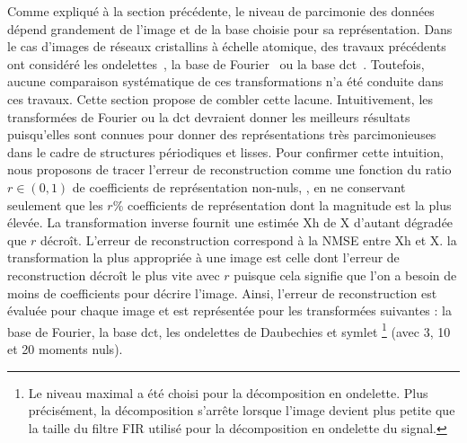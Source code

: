 Comme expliqué à la section précédente, le niveau de parcimonie des données dépend grandement de l'image et de la base choisie pour sa représentation. Dans le cas d'images de réseaux cristallins à échelle atomique, des travaux précédents ont considéré les ondelettes~\cite{li2018compressive}, la base de Fourier~\cite{stevens2018apl} ou la base \gls{dct}~\cite{beche2016development,anderson2013sparse}. Toutefois, aucune comparaison systématique de ces transformations n'a été conduite dans ces travaux. Cette section propose de combler cette lacune. Intuitivement, les transformées de Fourier ou la \gls{dct} devraient donner les meilleurs résultats puisqu'elles sont connues pour donner des représentations très parcimonieuses dans le cadre de structures périodiques et lisses. 
%
Pour confirmer cette intuition, nous proposons de tracer l'erreur de reconstruction comme une fonction du ratio $r\in(0, 1)$ de coefficients de représentation non-nuls, \ie{}, en ne conservant seulement que les $r$\% coefficients de représentation dont la magnitude est la plus élevée. La transformation inverse fournit une estimée \gls{Xh} de \gls{X} d'autant dégradée que $r$ décroît. L'erreur de reconstruction correspond à la NMSE entre \gls{Xh} et \gls{X}. la transformation la plus appropriée à une image est celle dont l'erreur de reconstruction décroît le plus vite avec $r$ puisque cela signifie que l'on a besoin de moins de coefficients pour décrire l'image.
%
Ainsi, l'erreur de reconstruction est évaluée pour chaque image et est représentée pour les transformées suivantes : la base de Fourier, la base \gls{dct}, les ondelettes de Daubechies et symlet%
%
\footnote{Le niveau maximal a été choisi pour la décomposition en ondelette. Plus précisément, la décomposition s'arrête lorsque l'image devient plus petite que la taille du filtre FIR utilisé pour la décomposition en ondelette du signal.} %
%
(avec 3, 10 et 20 moments nuls). 
%

